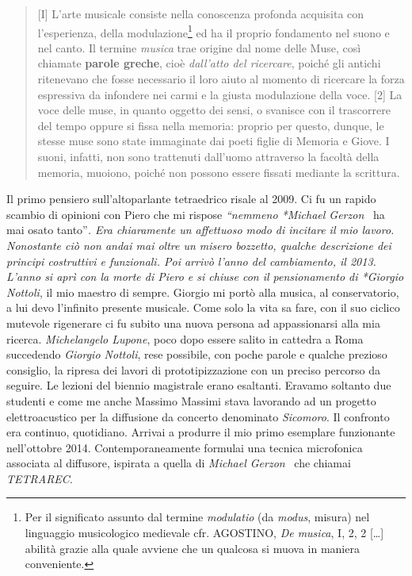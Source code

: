 \documentclass[a4paper,11pt]{article}
\begin{document}
\begin{quote}
{[}I{]} L'arte musicale consiste nella conoscenza profonda acquisita con
l'esperienza, della modulazione\footnote{Per il significato assunto dal termine \emph{modulatio} (da \emph{modus},
misura) nel linguaggio musicologico medievale cfr. AGOSTINO, \emph{De
musica}, I, 2, 2 {[}\ldots{}{]} abilità grazie alla quale avviene che un
qualcosa si muova in maniera conveniente.} ed ha il proprio fondamento nel
suono e nel canto. Il termine \emph{musica} trae origine dal nome delle
Muse, così chiamate \textbf{parole greche}, cioè \emph{dall'atto del ricercare},
poiché gli antichi ritenevano che fosse necessario il loro aiuto al
momento di ricercare la forza espressiva da infondere nei carmi e la
giusta modulazione della voce. {[}2{]} La voce delle muse, in quanto
oggetto dei sensi, o svanisce con il trascorrere del tempo oppure si
fissa nella memoria: proprio per questo, dunque, le stesse muse sono
state immaginate dai poeti figlie di Memoria e Giove. I suoni,
infatti, non sono trattenuti dall'uomo attraverso la facoltà della
memoria, muoiono, poiché non possono essere fissati mediante la
scrittura.
\end{quote}

Il primo pensiero sull'altoparlante tetraedrico risale al 2009. Ci fu un
rapido scambio di opinioni con Piero che mi rispose \emph{``nemmeno *Michael
Gerzon}  ha mai osato tanto''\emph{. Era chiaramente un affettuoso modo di
incitare il mio lavoro. Nonostante ciò non andai mai oltre un misero
bozzetto, qualche descrizione dei principi costruttivi e funzionali. Poi
arrivò l'anno del cambiamento, il 2013. L'anno si aprì con la morte di
Piero e si chiuse con il pensionamento di *Giorgio Nottoli}, il mio
maestro di sempre. Giorgio mi portò alla musica, al conservatorio, a lui
devo l'infinito presente musicale. Come solo la vita sa fare, con il suo
ciclico mutevole rigenerare ci fu subito una nuova persona ad
appassionarsi alla mia ricerca. \emph{Michelangelo Lupone}, poco dopo essere
salito in cattedra a Roma succedendo \emph{Giorgio Nottoli}, rese possibile,
con poche parole e qualche prezioso consiglio, la ripresa dei lavori di
prototipizzazione con un preciso percorso da seguire. Le lezioni del
biennio magistrale erano esaltanti. Eravamo soltanto due studenti e come
me anche Massimo Massimi stava lavorando ad un progetto elettroacustico
per la diffusione da concerto denominato \emph{Sicomoro}. Il confronto era
continuo, quotidiano. Arrivai a produrre il mio primo esemplare
funzionante nell'ottobre 2014. Contemporaneamente formulai una tecnica
microfonica associata al diffusore, ispirata a quella di \emph{Michael
Gerzon}  che chiamai \emph{TETRAREC}.
\end{document}

